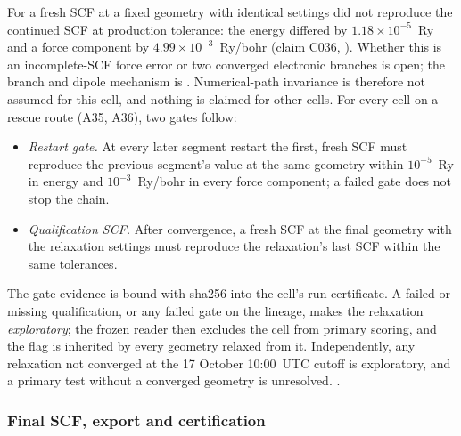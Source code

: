 For  a fresh SCF at a fixed geometry with identical settings did not reproduce the continued SCF
at production tolerance: the energy differed by $1.18\times10^{-5}$~Ry and a force component by
$4.99\times10^{-3}$~Ry/bohr (claim C036, ). %
Whether this is an incomplete-SCF force error or two converged electronic branches is open; the branch and dipole
mechanism is . Numerical-path invariance is therefore not assumed for this cell, and nothing is claimed
for other cells. %
For every cell on a rescue route (A35, A36), two gates follow:
\begin{itemize}
\item \emph{Restart gate.} At every later segment restart the first, fresh SCF must reproduce the previous segment's
value at the same geometry within $10^{-5}$~Ry in energy and $10^{-3}$~Ry/bohr in every force component; a failed gate
does not stop the chain. %
\item \emph{Qualification SCF.} After convergence, a fresh SCF at the final geometry with the relaxation settings must
reproduce the relaxation's last SCF within the same tolerances. %
\end{itemize}
The gate evidence is bound with sha256 into the cell's run certificate. A failed or missing qualification, or any
failed gate on the lineage, makes the relaxation \emph{exploratory}; the frozen reader then excludes the cell from
primary scoring, and the flag is inherited by every geometry relaxed from it. %
Independently, any relaxation not converged at the 17 October 10:00~UTC cutoff is exploratory, and a primary test
without a converged geometry is unresolved. %
.

\subsubsection{Final SCF, export and certification}
\label{sec:m-dft-final}

